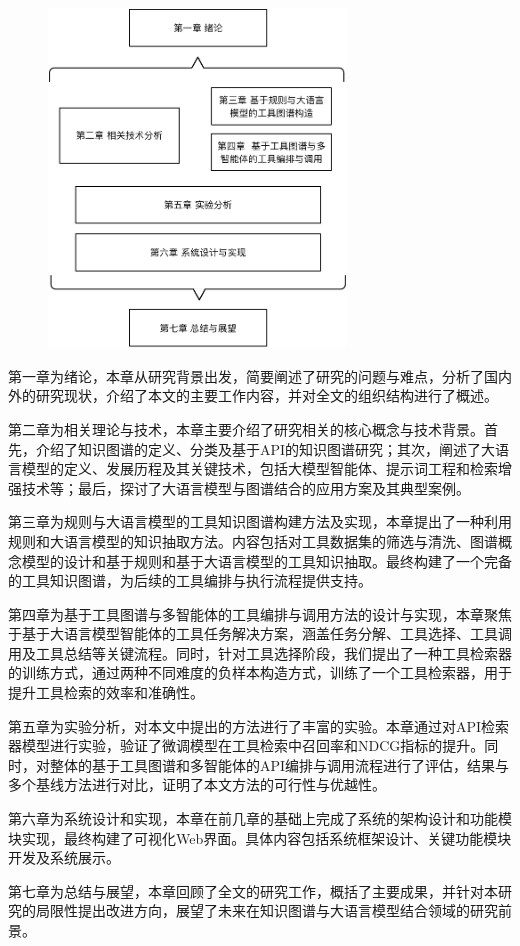 \begin{figure}[!htp]
    \vspace{1em}
    \centering
    \setlength{\abovecaptionskip}{10pt} %
    \includegraphics[height=9cm]{../assets/ch1-论文结构.pdf}
    \label{fig:ch1-structure}
  \end{figure}

  \indent 第一章为绪论，本章从研究背景出发，简要阐述了研究的问题与难点，分析了国内外的研究现状，介绍了本文的主要工作内容，并对全文的组织结构进行了概述。

  \indent 第二章为相关理论与技术，本章主要介绍了研究相关的核心概念与技术背景。首先，介绍了知识图谱的定义、分类及基于API的知识图谱研究；其次，阐述了大语言模型的定义、发展历程及其关键技术，包括大模型智能体、提示词工程和检索增强技术等；最后，探讨了大语言模型与图谱结合的应用方案及其典型案例。
  
  \indent 第三章为规则与大语言模型的工具知识图谱构建方法及实现，本章提出了一种利用规则和大语言模型的知识抽取方法。内容包括对工具数据集的筛选与清洗、图谱概念模型的设计和基于规则和基于大语言模型的工具知识抽取。最终构建了一个完备的工具知识图谱，为后续的工具编排与执行流程提供支持。
  
  \indent 第四章为基于工具图谱与多智能体的工具编排与调用方法的设计与实现，本章聚焦于基于大语言模型智能体的工具任务解决方案，涵盖任务分解、工具选择、工具调用及工具总结等关键流程。同时，针对工具选择阶段，我们提出了一种工具检索器的训练方式，通过两种不同难度的负样本构造方式，训练了一个工具检索器，用于提升工具检索的效率和准确性。
  
  \indent 第五章为实验分析，对本文中提出的方法进行了丰富的实验。本章通过对API检索器模型进行实验，验证了微调模型在工具检索中召回率和NDCG指标的提升。同时，对整体的基于工具图谱和多智能体的API编排与调用流程进行了评估，结果与多个基线方法进行对比，证明了本文方法的可行性与优越性。
  
  \indent 第六章为系统设计和实现，本章在前几章的基础上完成了系统的架构设计和功能模块实现，最终构建了可视化Web界面。具体内容包括系统框架设计、关键功能模块开发及系统展示。
  
  \indent 第七章为总结与展望，本章回顾了全文的研究工作，概括了主要成果，并针对本研究的局限性提出改进方向，展望了未来在知识图谱与大语言模型结合领域的研究前景。